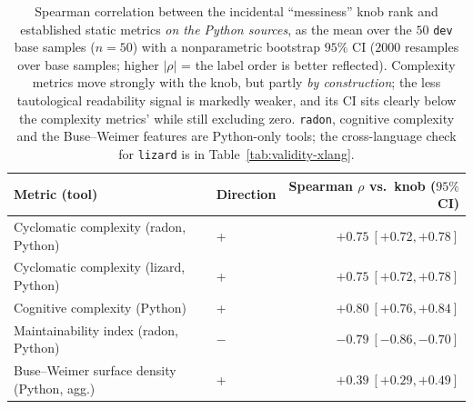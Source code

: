\begin{table}[t]
\centering
\caption{Spearman correlation between the incidental ``messiness'' knob rank and
established static metrics \emph{on the Python sources}, as the mean over the $50$
\texttt{dev} base samples ($n{=}50$) with a nonparametric bootstrap $95\%$ CI ($2000$
resamples over base samples; higher $|\rho|$ = the label order is better reflected).
Complexity metrics move strongly with the knob, but partly \emph{by construction}; the
less tautological readability signal is markedly weaker, and its CI sits clearly below
the complexity metrics' while still excluding zero. \texttt{radon}, cognitive complexity
and the Buse--Weimer features are Python-only tools; the cross-language check for
\texttt{lizard} is in Table~\ref{tab:validity-xlang}.}
\label{tab:validity}
\begin{tabular}{@{}llr@{}}
\toprule
Metric (tool) & Direction & Spearman $\rho$ vs.\ knob ($95\%$ CI) \\
\midrule
Cyclomatic complexity (radon, Python)   & + & $+0.75\ [+0.72,+0.78]$ \\
Cyclomatic complexity (lizard, Python)  & + & $+0.75\ [+0.72,+0.78]$ \\
Cognitive complexity (Python)           & + & $+0.80\ [+0.76,+0.84]$ \\
Maintainability index (radon, Python)   & $-$ & $-0.79\ [-0.86,-0.70]$ \\
Buse--Weimer surface density (Python, agg.) & + & $+0.39\ [+0.29,+0.49]$ \\
\bottomrule
\end{tabular}
\end{table}

